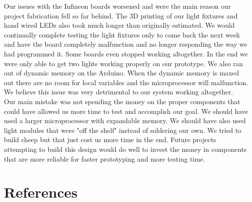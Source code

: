\documentclass[12pt,a4paper]{report}
\begin{document}
Our issues with the Infineon boards worsened and were the main reason our project fabrication fell so far behind. The 3D printing of our light fixtures and hand wired LEDs also took much longer than originally estimated. We would continually complete testing the light fixtures only to come back the next week and have the board completely malfunction and no longer responding the way we had programmed it. Some boards even stopped working altogether. In the end we were only able to get two lights working properly on our prototype. We also ran out of dynamic memory on the Arduino. When the dynamic memory is maxed out there are no room for local variables and the microprocessor will malfunction. We believe this issue was very detrimental to our system working altogether.\\
Our main mistake was not spending the money on the proper components that could have allowed us more time to test and accomplish our goal. We should have used a larger microprocessor with expandable memory. We should have also used light modules that were "off the shelf" instead of soldering our own. We tried to build cheep but that just cost us more time in the end. Future projects attempting to build this design would do well to invest the money in components that are more reliable for faster prototyping and more testing time.

 
\section{References}
\begingroup
   \def\chapter*#1{}
   
	
\endgroup	

 

\end{document}
